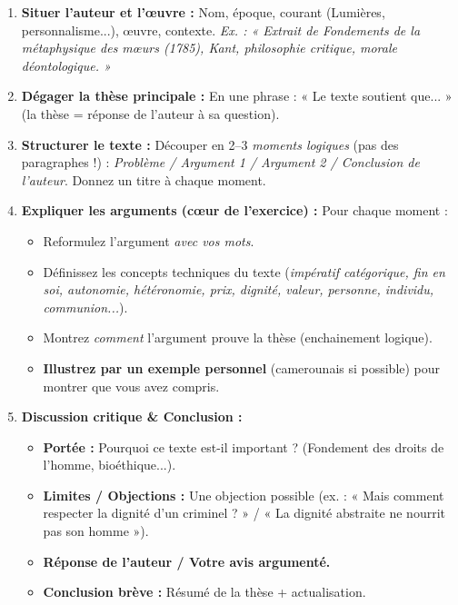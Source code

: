 \documentclass[11pt]{article}
\begin{document}
\begin{methode}
\begin{enumerate}
    \item \textbf{Situer l'auteur et l'œuvre :} Nom, époque, courant (Lumières, personnalisme...), œuvre, contexte. \emph{Ex. : « Extrait de \emph{Fondements de la métaphysique des mœurs} (1785), Kant, philosophie critique, morale déontologique. »}
    \item \textbf{Dégager la thèse principale :} En une phrase : « Le texte soutient que... » (la thèse = réponse de l'auteur à sa question).
    \item \textbf{Structurer le texte :} Découper en 2–3 \emph{moments logiques} (pas des paragraphes !) : \emph{Problème / Argument 1 / Argument 2 / Conclusion de l'auteur}. Donnez un titre à chaque moment.
    \item \textbf{Expliquer les arguments (cœur de l'exercice) :} Pour chaque moment :
        \begin{itemize}
            \item Reformulez l'argument \emph{avec vos mots}.
            \item Définissez les concepts techniques du texte (\emph{impératif catégorique, fin en soi, autonomie, hétéronomie, prix, dignité, valeur, personne, individu, communion...}).
            \item Montrez \emph{comment} l'argument prouve la thèse (enchainement logique).
            \item \textbf{Illustrez par un exemple personnel} (camerounais si possible) pour montrer que vous avez compris.
        \end{itemize}
    \item \textbf{Discussion critique \& Conclusion :}
        \begin{itemize}
            \item \textbf{Portée :} Pourquoi ce texte est-il important ? (Fondement des droits de l'homme, bioéthique...).
            \item \textbf{Limites / Objections :} Une objection possible (ex. : « Mais comment respecter la dignité d'un criminel ? » / « La dignité abstraite ne nourrit pas son homme »).
            \item \textbf{Réponse de l'auteur / Votre avis argumenté.}
            \item \textbf{Conclusion brève :} Résumé de la thèse + actualisation.
        \end{itemize}
\end{enumerate}
\end{methode}
\end{document}
